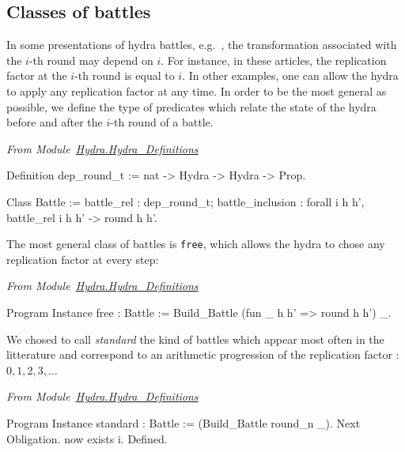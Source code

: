 \subsection{Classes of battles}
\label{sect:battle-classes}

In some presentations of hydra battles, e.g.~\cite{KP82, bauer2008}, the transformation associated with the $i$-th round may depend on $i$. For instance, in these articles, the replication factor at the $i$-th round is equal to $i$. In other examples, one can allow the hydra to apply any replication factor at any time. In order to be the most general as possible, we define the type of predicates which relate the state of the hydra before and after the $i$-th round of a battle.

\vspace{4pt}
\emph{From Module~\href{../theories/html/hydras.Hydra.Hydra_Definitions.html}{Hydra.Hydra\_Definitions}}
\label{types:Battle}

\begin{Coqsrc}
Definition dep_round_t := nat -> Hydra -> Hydra -> Prop.

Class Battle :=  
    { battle_rel : dep_round_t;
      battle_inclusion : forall i h h', battle_rel i h h' -> round h h'}.
\end{Coqsrc}

The most general class of battles is \texttt{free}, which allows the hydra to chose any replication factor at every step:

\vspace{4pt}
\emph{From Module~\href{../theories/html/hydras.Hydra.Hydra_Definitions.html\#free}{Hydra.Hydra\_Definitions}}

\begin{Coqsrc}
Program Instance free : Battle := Build_Battle (fun _  h h' => round h h') _.
\end{Coqsrc}

We chosed to call \emph{standard} the kind of battles which appear  most often in the litterature and correspond to an arithmetic progression of the replication factor : $0,1,2,3, \dots$

\vspace{4pt}
\emph{From Module~\href{../theories/html/hydras.Hydra.Hydra_Definitions.html\#standard}{Hydra.Hydra\_Definitions}}

\begin{Coqsrc}
Program Instance standard : Battle := (Build_Battle round_n _).
Next Obligation.
  now exists i.  
Defined.
\end{Coqsrc}


